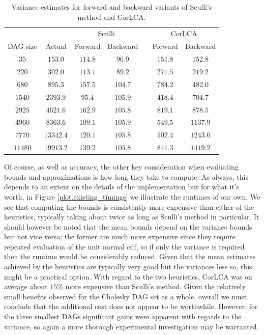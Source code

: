 \documentclass[12pt]{article}
\begin{document}
      \begin{table}
	\caption{Variance estimates for forward and backward variants of Sculli's method and CorLCA.} 
	\begin{center}	
		\begin{tabular}{c c c c c c c}
                  \toprule
                  && \multicolumn{2}{c}{Sculli} && \multicolumn{2}{c}{CorLCA} \\
                  \cmidrule{3-4} \cmidrule{6-7}
                  DAG size & Actual & Forward & Backward && Forward & Backward \\
                  \cmidrule{1-7}
                  $35$ & $153.0$ & $114.8$ & $96.9$ && $151.8$ & $152.8$\\
                  $220$ & $302.0$ & $113.1$ & $89.2$ && $271.5$ & $219.2$ \\
                  $680$ & $895.3$ &$157.5$ & $104.7$ && $784.2$ &  $482.0$\\
                  $1540$ & $2393.9$ & $95.4$ & $105.9$ && $418.4$ & $704.7$ \\
                  $2925$ & $4621.6$ & $162.9$ & $105.8$ && $819.1$ & $878.5$ \\
                  $4960$ & $8363.6$ & $109.1$ & $105.9$ && $549.5$ & $1137.9$ \\
                  $7770$ & $13342.4$ &$120.1$ & $105.8$ && $502.4$ & $1243.6$ \\
                  $11480$ & $19913.2$ &$139.2$ & $105.8$ && $841.3$ & $1419.2$ \\
		\bottomrule
		\end{tabular}
		\label{tb.direction_var}
	\end{center}	
      \end{table}

      Of course, as well as accuracy, the other key consideration when evaluating bounds and approximations is how long they take to compute. As always, this depends to an extent on the details of the implementation but for what it's worth, in Figure \ref{plot.existing_timings} we illustrate the runtimes of our own. We see that computing the bounds is consistently more expensive than either of the heuristics, typically taking about twice as long as Sculli's method in particular. It should however be noted that the mean bounds depend on the variance bounds but not vice versa; the former are much more expensive since they require repeated evaluation of the unit normal cdf, so if only the variance is required then the runtime would be considerably reduced. Given that the mean estimates achieved by the heuristics are typically very good but the variances less so, this might be a practical option. With regard to the two heuristics, CorLCA was on average about $15\%$ more expensive than Sculli's method. Given the relatively small benefits observed for the Cholesky DAG set as a whole, overall we must conclude that the additional cost does not appear to be worthwhile. However, for the three smallest DAGs significant gains were apparent with regards to the variance, so again a more thorough experimental investigation may be warranted.  
\end{document}
